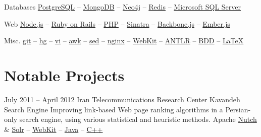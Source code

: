 \documentclass{tccv}
\begin{document}
{{\begin{factlist}
\item{Databases}
     {
     \href{http://www.postgresql.org}{PostgreSQL} -- 
     \href{http://www.mongodb.org}{MongoDB} -- 
     \href{http://www.neo4j.org}{Neo4j} -- 
     \href{http://redis.io}{Redis} -- 
     \href{http://www.microsoft.com/en-us/sqlserver/default.aspx}{Microsoft SQL Server}
     }

\item{Web}
     {
     \href{http://nodejs.org}{Node.js} -- 
     \href{http://rubyonrails.org}{Ruby on Rails} -- 
     \href{http://php.net}{PHP} -- 
     \href{http://www.sinatrarb.com}{Sinatra} -- 
     \href{http://backbonejs.org}{Backbone.js} -- 
     \href{http://emberjs.com}{Ember.js}
     }

\item{Misc.}
     {
     \href{http://git-scm.com}{git} -- 
     \href{http://www.selenic.com/mercurial/}{hg} -- 
     \href{http://www.vim.org}{vi} -- 
     \href{http://awk.info}{awk} -- 
     \href{http://www.gnu.org/software/sed/}{sed} -- 
     \href{http://nginx.org/en/}{nginx} -- 
     \href{http://www.webkit.org}{WebKit} -- 
     \href{http://www.antlr.org}{ANTLR} -- 
     \href{http://en.wikipedia.org/wiki/Behavior-driven_development}{BDD} -- 
     \href{http://www.latex-project.org}{\LaTeX}
     }

\end{factlist}





\newpage





\section{Notable Projects}

\begin{project_list}

\item{July 2011 -- April 2012}
     {Iran Telecommunications Research Center}
     {Kavandeh Search Engine}
	 {Improving link-based Web page ranking algorithms in a Persian-only search engine, using various statistical and heuristic methods.}
     {%
     	Apache \href{http://nutch.apache.org}{Nutch} \&
		\href{http://lucene.apache.org/solr/}{Solr} -- 
		\href{http://www.webkit.org}{WebKit} -- 
		\href{http://www.oracle.com/technetwork/java/}{Java} -- 
		\href{https://en.wikipedia.org/wiki/C\%2B\%2B}{C++}%
	}

\vspace{-8pt}


\end{project_list}}}
\end{document}
